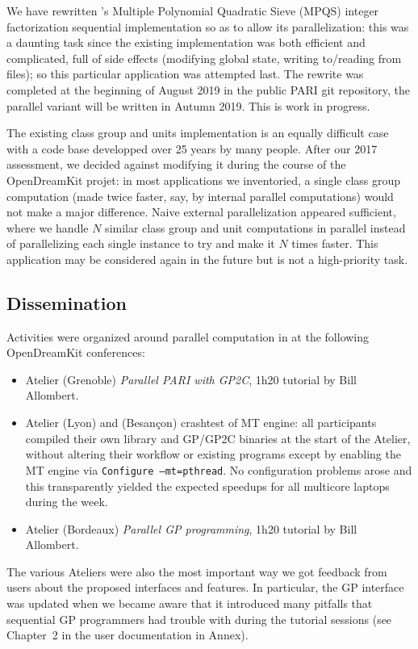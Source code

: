 \documentclass{deliverablereport}
\begin{document}
We have rewritten \Pari's Multiple Polynomial Quadratic Sieve (MPQS) integer
factorization sequential implementation so as to allow its parallelization:
this was a daunting task since the existing implementation was both efficient
and complicated, full of side effects (modifying global state, writing
to/reading from files); so this particular application was attempted last.
The rewrite was completed at the beginning of August 2019 in the public
PARI git repository, the parallel variant will be written in Autumn 2019.
This is work in progress.

The existing class group and units implementation is an equally difficult
case with a code base developped over 25 years by many people. After our 2017
assessment, we decided against modifying it during the course of the
OpenDreamKit projet: in most applications we inventoried, a single class
group computation (made twice faster, say, by internal parallel
computations) would not make a major difference. Naive external
parallelization appeared sufficient, where we handle $N$ similar class group 
and unit computations in parallel instead of parallelizing each single
instance to try and make it $N$ times faster. This application may be
considered again in the future but is not a high-priority task.

\subsection{Dissemination}

Activities were organized around parallel computation in \PariGP
at the following OpenDreamKit conferences:
\begin{itemize}
  \item Atelier  (Grenoble) \emph{Parallel PARI with GP2C},
  1h20 tutorial by Bill Allombert.
  \item Atelier  (Lyon) and  (Besançon)
  crashtest of MT engine: all participants compiled their own \Pari library and
  GP/GP2C  binaries at the start of the Atelier, without altering their
  workflow or existing programs except by enabling the MT engine via
  \texttt{Configure --mt=pthread}. No configuration problems arose and this
  transparently yielded the expected speedups for all multicore laptops during
  the week.

  \item Atelier  (Bordeaux) \emph{Parallel GP programming},
  1h20 tutorial by Bill Allombert.
\end{itemize}
The various Ateliers were also the most important way we got feedback from
users about the proposed interfaces and features. In particular, the GP
interface was updated when we became aware that it introduced many pitfalls
that sequential GP programmers had trouble with during the tutorial
sessions (see Chapter~2 in the user documentation in Annex).
\end{document}
